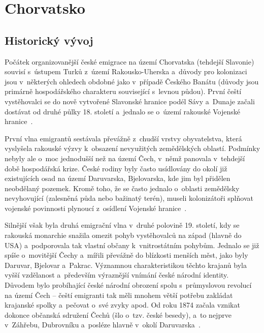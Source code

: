 \hypertarget{chorvatsko}{%
\section{Chorvatsko}\label{chorvatsko}}

\hypertarget{historickuxfd-vuxfdvoj-3}{%
\subsection*{Historický vývoj}\label{historickuxfd-vuxfdvoj-3}}

Počátek organizovanější české emigrace na území Chorvatska (tehdejší Slavonie) souvisí s~ústupem Turků z~území Rakousko-Uherska a~důvody pro kolonizaci jsou v~některých ohledech obdobné jako v~případě Českého Banátu (důvody jsou primárně hospodářského charakteru související s~levnou půdou). První čeští vystěhovalci se do nově vytvořené Slavonské hranice podél Sávy a~Dunaje začali dostávat od druhé půlky 18. století a~jednalo se o~území rakouské Vojenské hranice~\parencite{Preissova2020}.

První vlna emigrantů sestávala převážně z~chudší vrstvy obyvatelstva, která vyslyšela rakouské výzvy k~obsazení nevyužitých zemědělských oblastí. Podmínky nebyly ale o~moc jednodušší než na území Čech, v~němž panovala v~tehdejší době hospodářská krize. České rodiny byly často usídlovány do okolí již existujících osad na území Daruvarska, Bjelovarska, kde jim byl přidělen neobdělaný pozemek. Kromě toho, že se často jednalo o~oblasti zemědělsky nevyhovující (zalesněná půda nebo bažinatý terén), museli kolonizátoři splňovat vojenské povinnosti plynoucí z~osídlení Vojenské hranice~\parencite{Stranjik2017}.

Silnější však byla druhá emigrační vlna v~druhé polovině 19. století, kdy se rakouská monarchie snažila omezit pohyb vystěhovalců na západ (hlavně do USA) a~podporovala tak vlastní občany k~vnitrostátním pohybům. Jednalo se již spíše o~movitější Čechy a~mířili převážně do blízkosti menších měst, jako byly Daruvar, Bjelovar a~Pakrac. Významnou charakteristikou těchto krajanů byla vyšší vzdělanost a~především výraznější vnímání české národní identity. Důvodem bylo probíhající české národní obrození spolu s~průmyslovou revolucí na území Čech -- čeští emigranti tak měli mnohem větší potřebu zakládat krajanské spolky a~pečovat o~své zvyky apod. Od roku 1874 začala vznikat dokonce občanská sdružení Čechů (šlo o~tzv. české besedy), a~to nejprve v~Záhřebu, Dubrovníku a~posléze hlavně v~okolí Daruvarska~\parencite{Stranjik2017}.

